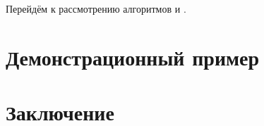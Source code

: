 \documentclass[12pt]{diploma}
\begin{document}
	Перейдём к рассмотрению алгоритмов \ikmeans и \imwkmeans.
	
%		

	  
	\subsubsection{\AWard}
	\subsubsection{\AWardpb}
	\subsubsection{\dePDDP}
	\subsubsection{\BiKMR}
	
	\section{Демонстрационный пример}
	\section{Заключение}	
	\newpage
	
	
	
\end{document}
